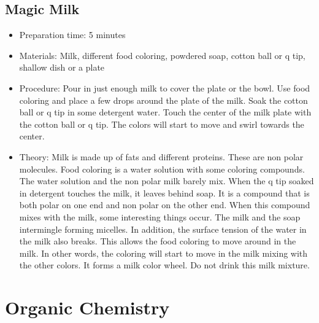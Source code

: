 \subsection{Magic Milk}
\begin{itemize}
\item{Preparation time: 5 minutes}
\item{Materials: Milk, different food coloring, powdered soap, cotton ball or q tip, shallow dish or a plate}
\item{Procedure: Pour in just enough milk to cover the plate or the bowl. Use food coloring and place a few drops around the plate of the milk. Soak the cotton ball or q tip in some detergent water. Touch the center of the milk plate with the cotton ball or q tip. The colors will start to move and swirl towards the center.}
\item{Theory: Milk is made up of fats and different proteins. These are non polar molecules. Food coloring is a water solution with some coloring compounds. The water solution and the non polar milk barely mix. When the q tip soaked in detergent touches the milk, it leaves behind soap. It is a compound that is both polar on one end and non polar on the other end. When this compound mixes with the milk, some interesting things occur. The milk and the soap intermingle forming micelles. In addition, the surface tension of the water in the milk also breaks. This allows the food coloring to move around in the milk. In other words, the coloring will start to move in the milk mixing with the other colors. It forms a milk color wheel. Do not drink this milk mixture.}
\end{itemize}

\section{Organic Chemistry}

